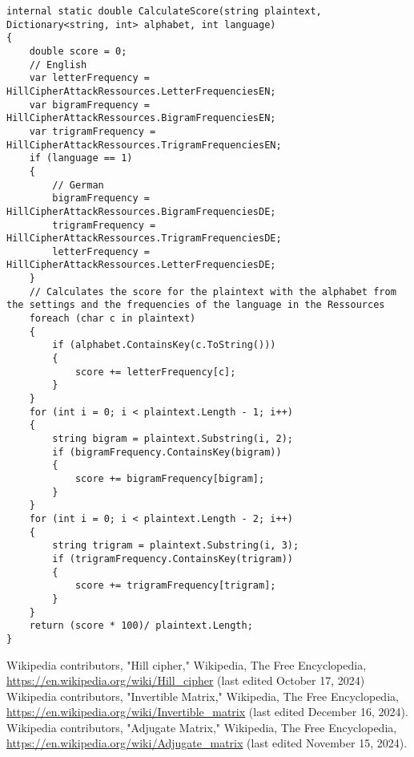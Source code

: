 \documentclass[conference]{IEEEtran}
\begin{document}
\begin{lstlisting}[caption={CalculateScore method}, label={lst:calcScore}]
internal static double CalculateScore(string plaintext, Dictionary<string, int> alphabet, int language)
{
    double score = 0;
    // English
    var letterFrequency = HillCipherAttackRessources.LetterFrequenciesEN;
    var bigramFrequency = HillCipherAttackRessources.BigramFrequenciesEN;
    var trigramFrequency = HillCipherAttackRessources.TrigramFrequenciesEN;
    if (language == 1)
    {
        // German
        bigramFrequency = HillCipherAttackRessources.BigramFrequenciesDE;
        trigramFrequency = HillCipherAttackRessources.TrigramFrequenciesDE;
        letterFrequency = HillCipherAttackRessources.LetterFrequenciesDE;
    }
    // Calculates the score for the plaintext with the alphabet from the settings and the frequencies of the language in the Ressources
    foreach (char c in plaintext)
    {
        if (alphabet.ContainsKey(c.ToString()))
        {
            score += letterFrequency[c];
        }
    }
    for (int i = 0; i < plaintext.Length - 1; i++)
    {
        string bigram = plaintext.Substring(i, 2);
        if (bigramFrequency.ContainsKey(bigram))
        {
            score += bigramFrequency[bigram];
        }
    }
    for (int i = 0; i < plaintext.Length - 2; i++)
    {
        string trigram = plaintext.Substring(i, 3);
        if (trigramFrequency.ContainsKey(trigram))
        {
            score += trigramFrequency[trigram];
        }
    }
    return (score * 100)/ plaintext.Length;
}
\end{lstlisting}

\begin{thebibliography}{9}
 Wikipedia contributors, "Hill cipher," Wikipedia, The Free Encyclopedia, \url{https://en.wikipedia.org/wiki/Hill_cipher} (last edited October 17, 2024)
 Wikipedia contributors, "Invertible Matrix," Wikipedia, The Free Encyclopedia, \url{https://en.wikipedia.org/wiki/Invertible_matrix} (last edited December 16, 2024).
  Wikipedia contributors, "Adjugate Matrix," Wikipedia, The Free Encyclopedia, \url{https://en.wikipedia.org/wiki/Adjugate_matrix} (last edited November 15, 2024).
\end{thebibliography}
\end{document}
